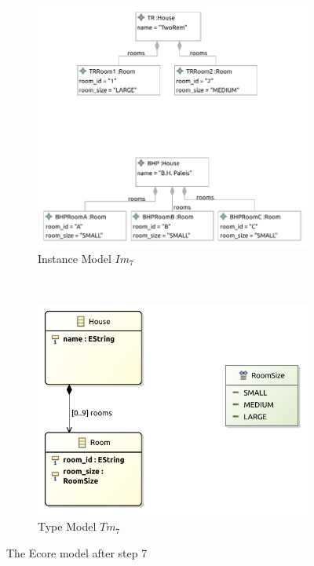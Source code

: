 \begin{figure}[p]
    \centering
    \begin{subfigure}{0.98\textwidth}
        \centering
        \includegraphics{images/06_application/instance_model/step07.pdf}
        \caption{Instance Model $Im_7$}
        \label{fig:application:building_the_model:room_sizes:ecore:instance_model}
    \end{subfigure}
    \\
    \begin{subfigure}{0.98\textwidth}
        \centering
        \includegraphics{images/06_application/type_model/step07.pdf}
        \caption{Type Model $Tm_7$}
        \label{fig:application:building_the_model:room_sizes:ecore:type_model}
    \end{subfigure}
    \caption{The Ecore model after step 7}
    \label{fig:application:building_the_model:room_sizes:ecore}
\end{figure}

